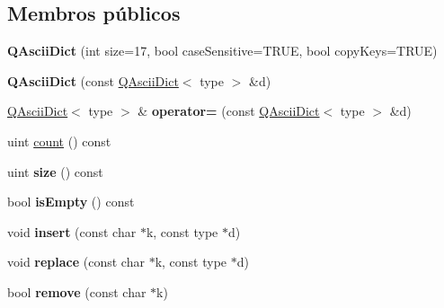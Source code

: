 \subsection*{Membros públicos}
\begin{DoxyCompactItemize}
\item 
\hypertarget{class_q_ascii_dict_a7b4ad1bbd8781e7adf4a03be12b40e1c}{{\bfseries Q\-Ascii\-Dict} (int size=17, bool case\-Sensitive=T\-R\-U\-E, bool copy\-Keys=T\-R\-U\-E)}\label{class_q_ascii_dict_a7b4ad1bbd8781e7adf4a03be12b40e1c}

\item 
\hypertarget{class_q_ascii_dict_a4cd6e15c72ee098a20b91934f6691f4b}{{\bfseries Q\-Ascii\-Dict} (const \hyperlink{class_q_ascii_dict}{Q\-Ascii\-Dict}$<$ type $>$ \&d)}\label{class_q_ascii_dict_a4cd6e15c72ee098a20b91934f6691f4b}

\item 
\hypertarget{class_q_ascii_dict_a9cbedd14b1931fe783dd24ccbbc29a97}{\hyperlink{class_q_ascii_dict}{Q\-Ascii\-Dict}$<$ type $>$ \& {\bfseries operator=} (const \hyperlink{class_q_ascii_dict}{Q\-Ascii\-Dict}$<$ type $>$ \&d)}\label{class_q_ascii_dict_a9cbedd14b1931fe783dd24ccbbc29a97}

\item 
uint \hyperlink{class_q_ascii_dict_a774149fc271ebaba2aabcd183a836e8f}{count} () const 
\item 
\hypertarget{class_q_ascii_dict_a7e63723212bed1ca52f0fe57e58b812e}{uint {\bfseries size} () const }\label{class_q_ascii_dict_a7e63723212bed1ca52f0fe57e58b812e}

\item 
\hypertarget{class_q_ascii_dict_a479432127ee77145cc19d6a2d1590821}{bool {\bfseries is\-Empty} () const }\label{class_q_ascii_dict_a479432127ee77145cc19d6a2d1590821}

\item 
\hypertarget{class_q_ascii_dict_a667e9408c0edabe35ba8fd1f8f229938}{void {\bfseries insert} (const char $\ast$k, const type $\ast$d)}\label{class_q_ascii_dict_a667e9408c0edabe35ba8fd1f8f229938}

\item 
\hypertarget{class_q_ascii_dict_adfbd37c3d3bf599ba35eca35bba37300}{void {\bfseries replace} (const char $\ast$k, const type $\ast$d)}\label{class_q_ascii_dict_adfbd37c3d3bf599ba35eca35bba37300}

\item 
\hypertarget{class_q_ascii_dict_abc36869a870103b2cef3f5842bf90835}{bool {\bfseries remove} (const char $\ast$k)}\label{class_q_ascii_dict_abc36869a870103b2cef3f5842bf90835}


\end{DoxyCompactItemize}
